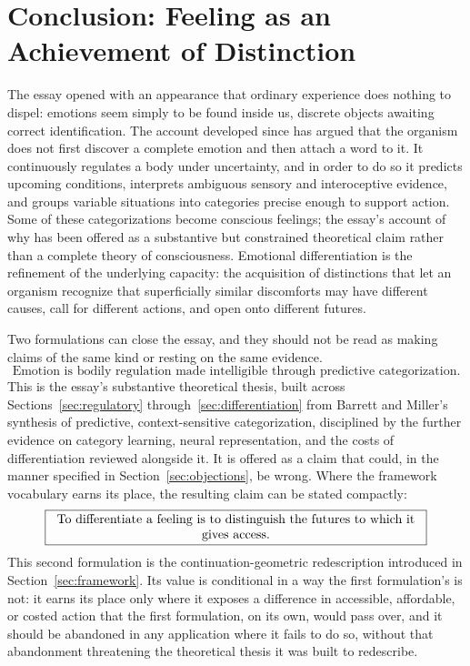 \documentclass[11pt]{article}
\begin{document}
\section{Conclusion: Feeling as an Achievement of Distinction}

The essay opened with an appearance that ordinary experience does nothing to dispel: emotions seem simply to be found inside us, discrete objects awaiting correct identification. The account developed since has argued that the organism does not first discover a complete emotion and then attach a word to it. It continuously regulates a body under uncertainty, and in order to do so it predicts upcoming conditions, interprets ambiguous sensory and interoceptive evidence, and groups variable situations into categories precise enough to support action. Some of these categorizations become conscious feelings; the essay's account of why has been offered as a substantive but constrained theoretical claim rather than a complete theory of consciousness. Emotional differentiation is the refinement of the underlying capacity: the acquisition of distinctions that let an organism recognize that superficially similar discomforts may have different causes, call for different actions, and open onto different futures.

Two formulations can close the essay, and they should not be read as making claims of the same kind or resting on the same evidence.
\[
\boxed{\text{Emotion is bodily regulation made intelligible through predictive categorization.}}
\]
This is the essay's substantive theoretical thesis, built across Sections~\ref{sec:regulatory} through~\ref{sec:differentiation} from Barrett and Miller's synthesis of predictive, context-sensitive categorization, disciplined by the further evidence on category learning, neural representation, and the costs of differentiation reviewed alongside it. It is offered as a claim that could, in the manner specified in Section~\ref{sec:objections}, be wrong.
Where the framework vocabulary earns its place, the resulting claim can be stated compactly:
\[
\boxed{\parbox{0.85\textwidth}{\centering To differentiate a feeling is to distinguish the futures to which it gives access.}}
\]
This second formulation is the continuation-geometric redescription introduced in Section~\ref{sec:framework}. Its value is conditional in a way the first formulation's is not: it earns its place only where it exposes a difference in accessible, affordable, or costed action that the first formulation, on its own, would pass over, and it should be abandoned in any application where it fails to do so, without that abandonment threatening the theoretical thesis it was built to redescribe.
\end{document}
